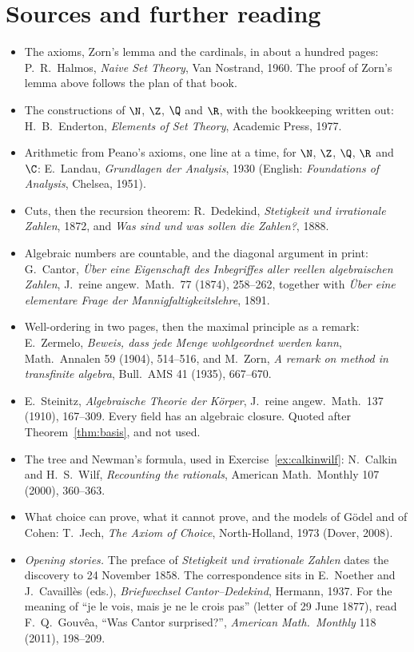 \section*{Sources and further reading}

\begin{itemize}
\item The axioms, Zorn's lemma and the cardinals, in about a hundred pages: P.~R.~Halmos, \emph{Naive Set Theory}, Van Nostrand, 1960. The proof of Zorn's lemma above follows the plan of that book.
\item The constructions of $\N$, $\Z$, $\Q$ and $\R$, with the bookkeeping written out: H.~B.~Enderton, \emph{Elements of Set Theory}, Academic Press, 1977.
\item Arithmetic from Peano's axioms, one line at a time, for $\N$, $\Z$, $\Q$, $\R$ and $\C$: E.~Landau, \emph{Grundlagen der Analysis}, 1930 (English: \emph{Foundations of Analysis}, Chelsea, 1951).
\item Cuts, then the recursion theorem: R.~Dedekind, \emph{Stetigkeit und irrationale Zahlen}, 1872, and \emph{Was sind und was sollen die Zahlen?}, 1888.
\item Algebraic numbers are countable, and the diagonal argument in print: G.~Cantor, \emph{\"Uber eine Eigenschaft des Inbegriffes aller reellen algebraischen Zahlen}, J.~reine angew.\ Math.\ 77 (1874), 258--262, together with \emph{\"Uber eine elementare Frage der Mannigfaltigkeitslehre}, 1891.
\item Well-ordering in two pages, then the maximal principle as a remark: E.~Zermelo, \emph{Beweis, dass jede Menge wohlgeordnet werden kann}, Math.\ Annalen 59 (1904), 514--516, and M.~Zorn, \emph{A remark on method in transfinite algebra}, Bull.\ AMS 41 (1935), 667--670.
\item E.~Steinitz, \emph{Algebraische Theorie der K\"orper}, J.~reine angew.\ Math.\ 137 (1910), 167--309. Every field has an algebraic closure. Quoted after Theorem~\ref{thm:basis}, and not used.
\item The tree and Newman's formula, used in Exercise~\ref{ex:calkinwilf}: N.~Calkin and H.~S.~Wilf, \emph{Recounting the rationals}, American Math.\ Monthly 107 (2000), 360--363.
\item What choice can prove, what it cannot prove, and the models of G\"odel and of Cohen: T.~Jech, \emph{The Axiom of Choice}, North-Holland, 1973 (Dover, 2008).
\item \emph{Opening stories.} The preface of \emph{Stetigkeit und irrationale Zahlen} dates the discovery to 24 November 1858. The correspondence sits in E.~Noether and J.~Cavaill\`es (eds.), \emph{Briefwechsel Cantor--Dedekind}, Hermann, 1937. For the meaning of ``je le vois, mais je ne le crois pas'' (letter of 29 June 1877), read F.~Q.~Gouv\^ea, ``Was Cantor surprised?'', \emph{American Math.\ Monthly} 118 (2011), 198--209.

\end{itemize}
